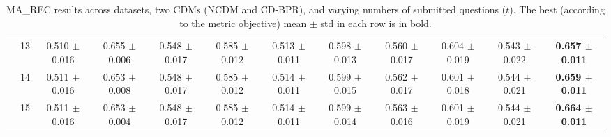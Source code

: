 \begin{table*}[t]
{\begin{tabular}{%
  ll
  @{\quad}
  c@{\hskip 4pt}c
  @{\quad\quad}
  c@{\hskip 4pt}c
  @{\quad\quad}
  c@{\hskip 4pt}c
  @{\quad\quad}
  c@{\hskip 4pt}c
  @{\quad\quad}
  c@{\hskip 4pt}c
}
        & 13 & 0.510 $\pm$ 0.016 & 0.655 $\pm$ 0.006 & 0.548 $\pm$ 0.017 & 0.585 $\pm$ 0.012 & 0.513 $\pm$ 0.011 & 0.598 $\pm$ 0.013 & 0.560 $\pm$ 0.017 & 0.604 $\pm$ 0.019 & 0.543 $\pm$ 0.022 & \textbf{0.657 $\pm$ 0.011} \\
        & 14 & 0.511 $\pm$ 0.016 & 0.653 $\pm$ 0.008 & 0.548 $\pm$ 0.017 & 0.585 $\pm$ 0.012 & 0.514 $\pm$ 0.011 & 0.599 $\pm$ 0.015 & 0.562 $\pm$ 0.017 & 0.601 $\pm$ 0.018 & 0.544 $\pm$ 0.021 & \textbf{0.659 $\pm$ 0.011} \\
        & 15 & 0.511 $\pm$ 0.016 & 0.653 $\pm$ 0.004 & 0.548 $\pm$ 0.017 & 0.585 $\pm$ 0.012 & 0.514 $\pm$ 0.011 & 0.599 $\pm$ 0.014 & 0.563 $\pm$ 0.016 & 0.601 $\pm$ 0.019 & 0.544 $\pm$ 0.021 & \textbf{0.664 $\pm$ 0.011} \\
\bottomrule
\end{tabular}
}
\caption{MA_REC results across datasets, two CDMs (NCDM and CD-BPR), and varying numbers of submitted questions ($t$). The best (according to the metric objective) mean $\pm$ std in each row is in bold.}
\label{tab:results-ma_rec}
\end{table*}


